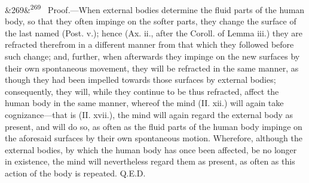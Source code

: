 \documentclass[12pt]{article}
\newcommand{\para}[1][]{\par\noindent\ifx&#1&\else\textsuperscript{\footnotesize #1}~\fi}
\begin{document}
\para[269] Proof.---When external bodies determine the fluid parts of the human body, so that they often impinge on the softer parts, they change the surface of the last named (Post. v.); hence (Ax. ii., after the Coroll. of Lemma iii.) they are refracted therefrom in a different manner from that which they followed before such change; and, further, when afterwards they impinge on the new surfaces by their own spontaneous movement, they will be refracted in the same manner, as though they had been impelled towards those surfaces by external bodies; consequently, they will, while they continue to be thus refracted, affect the human body in the same manner, whereof the mind (II. xii.) will again take cognizance---that is (II. xvii.), the mind will again regard the external body as present, and will do so, as often as the fluid parts of the human body impinge on the aforesaid surfaces by their own spontaneous motion. Wherefore, although the external bodies, by which the human body has once been affected, be no longer in existence, the mind will nevertheless regard them as present, as often as this action of the body is repeated. Q.E.D.
\end{document}
